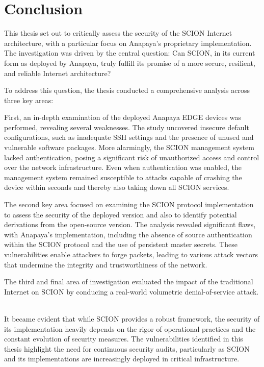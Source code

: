 \chapter{Conclusion}
\label{ch:conclusion}


This thesis set out to critically assess the security of the SCION Internet architecture, with a particular focus on Anapaya's proprietary implementation.
The investigation was driven by the central question:
Can SCION, in its current form as deployed by Anapaya, truly fulfill its promise of a more secure, resilient, and reliable Internet architecture?

To address this question, the thesis conducted a comprehensive analysis across three key areas:

First, an in-depth examination of the deployed Anapaya EDGE devices was performed, revealing several weaknesses.
The study uncovered insecure default configurations, such as inadequate SSH settings and the presence of unused and vulnerable software packages.
More alarmingly, the SCION management system lacked authentication, posing a significant risk of unauthorized access and control over the network infrastructure.
Even when authentication was enabled, the management system remained susceptible to attacks capable of crashing the device within seconds and thereby also taking down all SCION services.


The second key area focused on examining the SCION protocol implementation to assess the security of the deployed version and also to identify potential derivations from the open-source version.
The analysis revealed significant flaws, with Anapaya's implementation, including the absence of source authentication within the SCION protocol and the use of persistent master secrets.
These vulnerabilities enable attackers to forge packets, leading to various attack vectors that undermine the integrity and trustworthiness of the network.


The third and final area of investigation evaluated the impact of the traditional Internet on SCION by conducing a real-world volumetric denial-of-service attack.

\\
It became evident that while SCION provides a robust framework, the security of its implementation heavily depends on the rigor of operational practices and the constant evolution of security measures.
The vulnerabilities identified in this thesis highlight the need for continuous security audits, particularly as SCION and its implementations are increasingly deployed in critical infrastructure.

